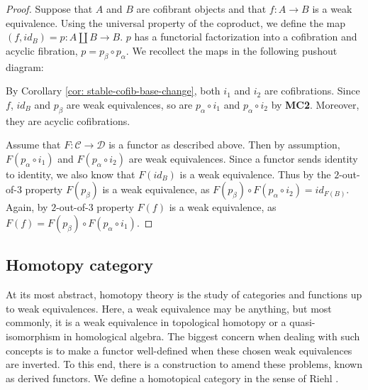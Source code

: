 \documentclass[../thesis.tex]{subfiles}
\begin{document}
            \begin{proof}
                Suppose that $A$ and $B$ are cofibrant objects and that $f: A\rightarrow B$ is a weak equivalence. Using the universal property of the coproduct, we define the map $(f, id_B) = p: A\coprod B \rightarrow B$. $p$ has a functorial factorization into a cofibration and acyclic fibration, $p = p_\beta\circ p_\alpha$. We recollect the maps in the following pushout diagram:
                \begin{center}
                \end{center}
                By Corollary \ref{cor: stable-cofib-base-change}, both $i_1$ and $i_2$ are cofibrations. Since $f$, $id_B$ and $p_\beta$ are weak equivalences, so are $p_\alpha\circ i_1$ and $p_\alpha\circ i_2$ by \textbf{MC2}. Moreover, they are acyclic cofibrations.

                Assume that $F:\mathcal{C}\rightarrow\mathcal{D}$ is a functor as described above. Then by assumption, $F(p_\alpha\circ i_1)$ and $F(p_\alpha\circ i_2)$ are weak equivalences. Since a functor sends identity to identity, we also know that $F(id_B)$ is a weak equivalence. Thus by the $2$-out-of-$3$ property $F(p_\beta)$ is a weak equivalence, as $F(p_\beta)\circ F(p_\alpha\circ i_2) = id_{F(B)}$. Again, by $2$-out-of-$3$ property $F(f)$ is a weak equivalence, as $F(f) = F(p_\beta)\circ F(p_\alpha\circ i_1)$.
            \end{proof}

        \subsection{Homotopy category}

            At its most abstract, homotopy theory is the study of categories and functions up to weak equivalences. Here, a weak equivalence may be anything, but most commonly, it is a weak equivalence in topological homotopy or a quasi-isomorphism in homological algebra. The biggest concern when dealing with such concepts is to make a functor well-defined when these chosen weak equivalences are inverted. To this end, there is a construction to amend these problems, known as derived functors. We define a homotopical category in the sense of Riehl \cite{Riehl16}.
\end{document}
